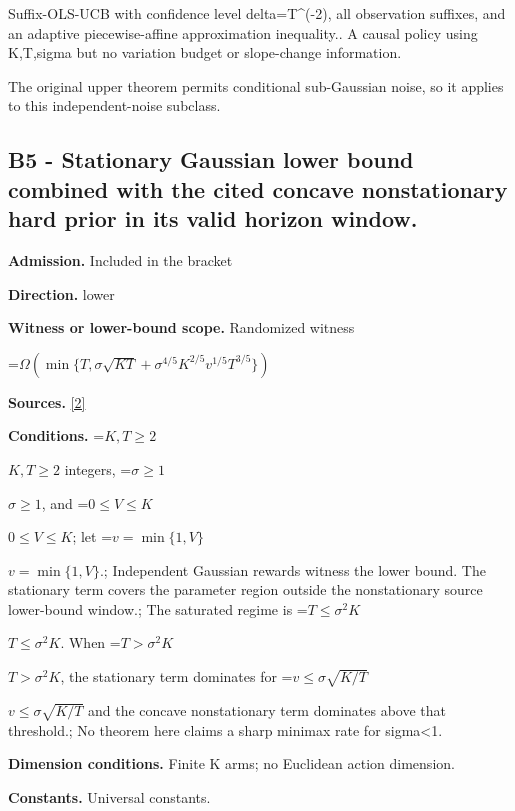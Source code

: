 \documentclass[10pt,a4paper]{article}
\newcommand{\AtlasMath}[1]{\par\begingroup\centering\setbox0=\hbox{$\displaystyle #1$}\ifdim\wd0>1.4\linewidth\typeout{ATLAS WIDE FORMULA: \the\wd0}\fi\ifdim\wd0>\linewidth\resizebox{\linewidth}{!}{\box0}\else\box0\fi\par\endgroup}
\newcommand{\AtlasInlineMath}[1]{\begingroup\setbox0=\hbox{$#1$}\ifdim\wd0>.4\linewidth\endgroup\AtlasMath{#1}\else\endgroup$#1$\fi}
\begin{document}
Suffix-OLS-UCB with confidence level delta=T\textasciicircum{}(-2), all observation suffixes, and an adaptive piecewise-affine approximation inequality.. A causal policy using K,T,sigma but no variation budget or slope-change information.



The original upper theorem permits conditional sub-Gaussian noise, so it applies to this independent-noise subclass.



\subsection{B5 - Stationary Gaussian lower bound combined with the cited concave nonstationary hard prior in its valid horizon window.}


\textbf{Admission.} Included in the bracket



\textbf{Direction.} lower



\textbf{Witness or lower-bound scope.} Randomized witness



\AtlasMath{\Omega\!\left(\min\{T,\sigma\sqrt{KT}+\sigma^{4/5}K^{2/5}v^{1/5}T^{3/5}\}\right)}


\textbf{Sources.} \href{https://github.com/WU-Wendao/Colombo/blob/main/colombo_sensorium/Complexity_altas/data/sources/colombo/U12/manuscript.pdf}{[2]}



\textbf{Conditions.} \AtlasInlineMath{K,T\ge2} integers, \AtlasInlineMath{\sigma\ge1}, and \AtlasInlineMath{0\le V\le K}; let \AtlasInlineMath{v=\min\{1,V\}}.; Independent Gaussian rewards witness the lower bound. The stationary term covers the parameter region outside the nonstationary source lower-bound window.; The saturated regime is \AtlasInlineMath{T\le\sigma^2K}. When \AtlasInlineMath{T>\sigma^2K}, the stationary term dominates for \AtlasInlineMath{v\le\sigma\sqrt{K/T}} and the concave nonstationary term dominates above that threshold.; No theorem here claims a sharp minimax rate for sigma<1.



\textbf{Dimension conditions.} Finite K arms; no Euclidean action dimension.



\textbf{Constants.} Universal constants.
\end{document}
